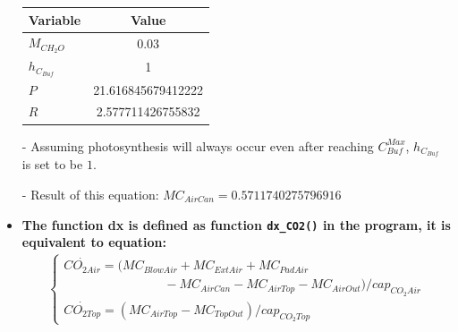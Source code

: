 \documentclass[a4paper]{article}
\numberwithin{equation}{section}
\begin{document}
\begin{itemize}
        \begin{table}[H]
          \centering
          \begin{tabular}{@{}lS[table-format=3.15]@{}}
            \toprule
            \textbf{Variable} & \textbf{Value}     \\
            \midrule
            \( M_{CH_2O} \)     & 0.03               \\
            \( h_{C_{Buf}} \)   & 1                  \\
            \( P \)             & 21.616845679412222 \\
            \( R \)             & 2.577711426755832  \\
            \bottomrule
          \end{tabular}
        \end{table}
  \item[-] Assuming photosynthesis will always occur even after reaching \( C^{Max}_{Buf} \), \( h_{C_{Buf}} \) is set to be \( 1 \).
  \item[-] Result of this equation: \( MC_{AirCan} = 0.5711740275796916 \)

  \item \textbf{The function \textbf{dx} is defined as function \texttt{dx\_CO2()} in the program, it is equivalent to equation:}
        \begin{align*}
          \begin{cases}
            \dot{CO_{2Air}} = (MC_{BlowAir} + MC_{ExtAir} + MC_{PadAir} \\ \qquad \qquad \qquad \qquad
            - MC_{AirCan} - MC_{AirTop} - MC_{AirOut}) / cap_{CO_2Air}  \\
            \dot{CO_{2Top}} = (MC_{AirTop} - MC_{TopOut}) / cap_{CO_2Top}
          \end{cases}
        \end{align*}


\end{itemize}
\end{document}
